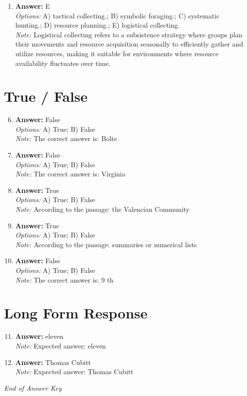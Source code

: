 \documentclass[12pt]{article}
\begin{document}
\begin{enumerate}[label=\arabic*.]
\item \textbf{Answer:} E
\\ \textit{Options:} A) tactical collecting.; B) symbolic foraging.; C) systematic hunting.; D) resource planning.; E) logistical collecting.
\\ \textit{Note:} Logistical collecting refers to a subsistence strategy where groups plan their movements and resource acquisition seasonally to efficiently gather and utilize resources, making it suitable for environments where resource availability fluctuates over time.
\end{enumerate}

\section*{True / False}
\begin{enumerate}[label=\arabic*.]
\setcounter{enumi}{5}
\item \textbf{Answer:} False
\\ \textit{Options:} A) True; B) False
\\ \textit{Note:} The correct answer is: Bolte
\item \textbf{Answer:} False
\\ \textit{Options:} A) True; B) False
\\ \textit{Note:} The correct answer is: Virginia
\item \textbf{Answer:} True
\\ \textit{Options:} A) True; B) False
\\ \textit{Note:} According to the passage: the Valencian Community
\item \textbf{Answer:} True
\\ \textit{Options:} A) True; B) False
\\ \textit{Note:} According to the passage: summaries or numerical lists
\item \textbf{Answer:} False
\\ \textit{Options:} A) True; B) False
\\ \textit{Note:} The correct answer is: 9 th
\end{enumerate}

\section*{Long Form Response}
\begin{enumerate}[label=\arabic*.]
\setcounter{enumi}{10}
\item \textbf{Answer:} eleven
\\ \textit{Note:} Expected answer: eleven
\item \textbf{Answer:} Thomas Cubitt
\\ \textit{Note:} Expected answer: Thomas Cubitt
\end{enumerate}

\vfill
\noindent\textit{End of Answer Key}
\end{document}
